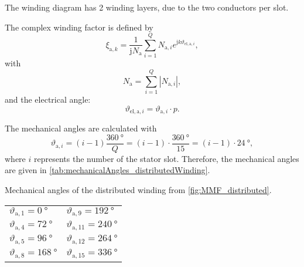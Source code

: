 
\begin{solutionblock}
    The winding diagram has 2 winding layers, due to the two conductors per slot.
\end{solutionblock}



\begin{solutionblock}
    The complex winding factor is defined by
    \begin{equation}
        \xi_{\mathrm{a,}k} = \frac{1}{\mathrm{j}N_{\mathrm{a}}} \sum_{i=1}^{Q} N_{\mathrm{a,}i}e^{\mathrm{j}k\vartheta_{\mathrm{el,a,}i}},
        \label{eq:complexWindingFactor}
    \end{equation}
    with
    \begin{equation}
        N_{\mathrm{a}} = \sum_{i=1}^{Q} |N_{\mathrm{a,}i} |,
    \end{equation}
    and the electrical angle:
    \begin{equation}
        \vartheta_{\mathrm{el,a,}i} = \vartheta_{\mathrm{a,}i} \cdot p.
    \end{equation}

    The mechanical angles are calculated with
    \begin{equation}
        \vartheta_{\mathrm{a,}i} = \left(i-1 \right) \frac{\SI{360}{\degree}}{Q}
        = \left(i-1 \right) \cdot \frac{\SI{360}{\degree}}{15}
        = \left(i-1 \right) \cdot \SI{24}{\degree},
    \end{equation}
    where $i$ represents the number of the stator slot.
    Therefore, the mechanical angles are given in \autoref{tab:mechanicalAngles_distributedWinding}.
    \begin{solutiontable}[ht]
        \caption{Mechanical angles of the distributed winding from \autoref{fig:MMF_distributed}.}
        \centering
        \begin{tabular}{C{3cm}|C{3cm}}\toprule
            $\vartheta_{\mathrm{a,}1} = \SI{0}{\degree}$     & $\vartheta_{\mathrm{a,}9} = \SI{192}{\degree}$ \\
            $\vartheta_{\mathrm{a,}4} = \SI{72}{\degree}$    & $\vartheta_{\mathrm{a,}11} = \SI{240}{\degree}$ \\
            $\vartheta_{\mathrm{a,}5} = \SI{96}{\degree}$    & $\vartheta_{\mathrm{a,}12} = \SI{264}{\degree}$ \\
            $\vartheta_{\mathrm{a,}8} = \SI{168}{\degree}$   & $\vartheta_{\mathrm{a,}15} = \SI{336}{\degree}$ \\
            \bottomrule
        \end{tabular}
        \label{tab:mechanicalAngles_distributedWinding}
    \end{solutiontable}


\end{solutionblock}
